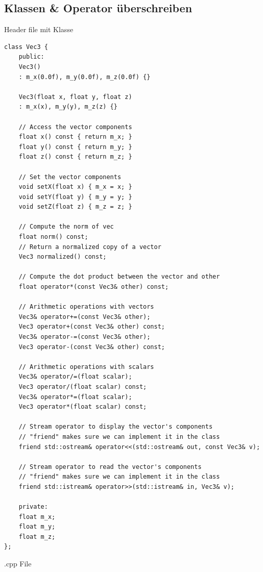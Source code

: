 \subsection{Klassen \& Operator überschreiben}
Header file mit Klasse
\begin{lstlisting}
class Vec3 {
	public:
	Vec3() 
	: m_x(0.0f), m_y(0.0f), m_z(0.0f) {}
	
	Vec3(float x, float y, float z) 
	: m_x(x), m_y(y), m_z(z) {}
	
	// Access the vector components  
	float x() const { return m_x; }
	float y() const { return m_y; }
	float z() const { return m_z; }
	
	// Set the vector components
	void setX(float x) { m_x = x; }
	void setY(float y) { m_y = y; }
	void setZ(float z) { m_z = z; }
	
	// Compute the norm of vec
	float norm() const;
	// Return a normalized copy of a vector
	Vec3 normalized() const;
	
	// Compute the dot product between the vector and other
	float operator*(const Vec3& other) const;
	
	// Arithmetic operations with vectors
	Vec3& operator+=(const Vec3& other);
	Vec3 operator+(const Vec3& other) const;
	Vec3& operator-=(const Vec3& other);
	Vec3 operator-(const Vec3& other) const;
	
	// Arithmetic operations with scalars
	Vec3& operator/=(float scalar);
	Vec3 operator/(float scalar) const;
	Vec3& operator*=(float scalar);
	Vec3 operator*(float scalar) const;
	
	// Stream operator to display the vector's components
	// "friend" makes sure we can implement it in the class
	friend std::ostream& operator<<(std::ostream& out, const Vec3& v);
	
	// Stream operator to read the vector's components
	// "friend" makes sure we can implement it in the class
	friend std::istream& operator>>(std::istream& in, Vec3& v);
	
	private:
	float m_x;
	float m_y;
	float m_z;
};
\end{lstlisting}
.cpp File
